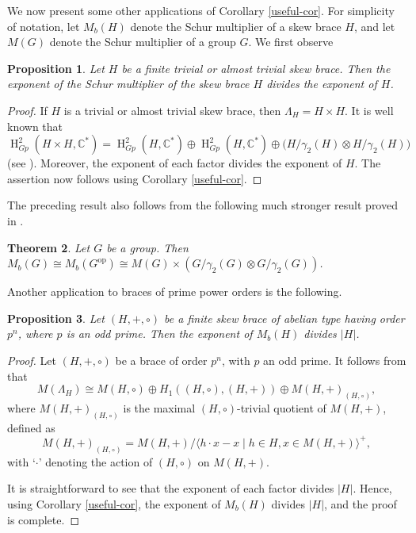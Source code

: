 \documentclass[11pt]{amsart}
\theoremstyle{thrm}
\theoremstyle{plain}
\newtheorem{thm}{Theorem}[section]
\newtheorem{prop}[thm]{Proposition}
\theoremstyle{definition}
\newcommand{\Ho}{\operatorname{H} }
\numberwithin{equation}{section}
\begin{document}
We now present some other applications of Corollary \ref{useful-cor}.  For simplicity of notation, let $M_b(H)$ denote the Schur multiplier of a skew brace $H$, and let $M(G)$ denote the Schur multiplier of a group $G$. We first observe 

\begin{prop}
	Let $H$ be a finite trivial or almost trivial skew brace. Then the exponent of the Schur multiplier of the skew brace $H$ divides the exponent of $H$.
\end{prop}
\begin{proof}
	If $H$ is a trivial or almost trivial skew brace, then $\Lambda_H = H \times H$. 
	It is well known that 
	\[
	\Ho^2_{Gp}(H \times H, \mathbb{C}^*) 
	= \Ho^2_{Gp}(H, \mathbb{C}^*) \oplus \Ho^2_{Gp}(H, \mathbb{C}^*) \oplus \bigl(H/\gamma_2(H) \otimes H/\gamma_2(H)\bigr)
	\]
	(see \cite{GK87}). Moreover, the exponent of each factor divides the exponent of $H$. The assertion now  follows using Corollary \ref{useful-cor}.
\end{proof}

The preceding result also follows from  the following much stronger result  proved in \cite[Proposition 2.4]{LV24}.

\begin{thm}
	Let $G$ be a group. Then $M_b(G) \cong M_b(G^{\mathrm{op}}) \cong M(G) \times (G/\gamma_2(G) \otimes G/\gamma_2(G))$.
\end{thm}

Another application to braces of prime power orders is the following.
\begin{prop}
	Let $(H, +, \circ)$ be a finite skew brace of abelian type having order $p^n$, where $p$ is an odd prime. Then the exponent of $M_b(H)$ divides $|H|$.
\end{prop}

\begin{proof}
	Let $(H, +, \circ)$ be a brace of order $p^n$, with $p$ an odd prime. It follows from  \cite[Section 2]{Evens72} that
	\[
	M(\Lambda_H) \cong M(H, \circ) \oplus H_1((H, \circ), (H, +)) \oplus M(H, +)_{(H, \circ)},
	\]
	where $M(H, +)_{(H, \circ)}$ is the maximal $(H, \circ)$-trivial quotient of $M(H, +)$, defined as
	\[
	M(H, +)_{(H, \circ)} = M(H, +) / \langle h \cdot x - x \mid h \in H, x \in M(H, +) \rangle^+,
	\]
	with `$\cdot$' denoting the action of $(H, \circ)$ on $M(H, +)$. 
	
	It is straightforward to see that the exponent of each factor divides $|H|$. Hence, using Corollary \ref{useful-cor}, the exponent of $M_b(H)$ divides $|H|$, and the proof is complete.
\end{proof}
\end{document}
